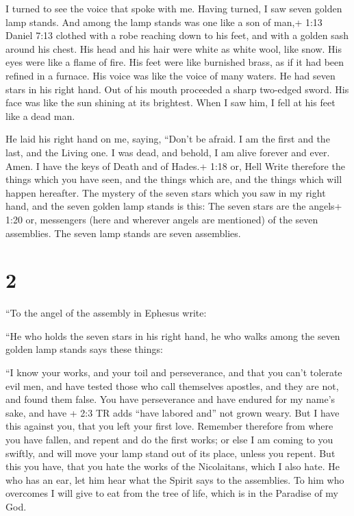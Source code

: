  I turned to see the voice that spoke with me. Having
turned, I saw seven golden lamp stands.  And among the lamp
stands was one like a son of man,+ 1:13 Daniel 7:13 clothed with a robe
reaching down to his feet, and with a golden sash around his chest.
 His head and his hair were white as white wool, like snow.
His eyes were like a flame of fire.  His feet were like
burnished brass, as if it had been refined in a furnace. His voice was
like the voice of many waters.  He had seven stars in his
right hand. Out of his mouth proceeded a sharp two-edged sword. His face
was like the sun shining at its brightest.  When I saw him,
I fell at his feet like a dead man.

He laid his right hand on me, saying, ``Don't be afraid. I am the first
and the last,  and the Living one. I was dead, and behold,
I am alive forever and ever. Amen. I have the keys of Death and of
Hades.+ 1:18 or, Hell  Write therefore the things which you
have seen, and the things which are, and the things which will happen
hereafter.  The mystery of the seven stars which you saw in
my right hand, and the seven golden lamp stands is this: The seven stars
are the angels+ 1:20 or, messengers (here and wherever angels are
mentioned) of the seven assemblies. The seven lamp stands are seven
assemblies.

\hypertarget{section-1}{%
\section{2}\label{section-1}}

 ``To the angel of the assembly in Ephesus write:

``He who holds the seven stars in his right hand, he who walks among the
seven golden lamp stands says these things:

 ``I know your works, and your toil and perseverance, and
that you can't tolerate evil men, and have tested those who call
themselves apostles, and they are not, and found them false.
 You have perseverance and have endured for my name's sake,
and have + 2:3 TR adds ``have labored and'' not grown weary.
 But I have this against you, that you left your first love.
 Remember therefore from where you have fallen, and repent
and do the first works; or else I am coming to you swiftly, and will
move your lamp stand out of its place, unless you repent. 
But this you have, that you hate the works of the Nicolaitans, which I
also hate.  He who has an ear, let him hear what the Spirit
says to the assemblies. To him who overcomes I will give to eat from the
tree of life, which is in the Paradise of my God.


